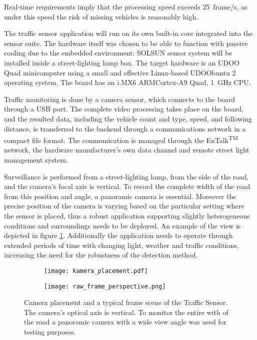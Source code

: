 Real-time requirements imply that the processing speed exceeds \SI{25}{frame/s}, as under this speed the risk of missing vehicles is reasonably high.

The traffic sensor application will run on its own built-in core integrated into the sensor suite.
The hardware itself was chosen to be able to function with passive cooling due to the embedded environment: SOLSUN sensor system will be installed inside a street-lighting lamp box.
The target hardware is an UDOO Quad minicomputer using a small and effective Linux-based UDOObuntu 2 operating system.
The board has an i.MX6 ARM\reg Cortex\reg-A9 Quad, \SI{1}{GHz} CPU.

Traffic monitoring is done by a camera sensor, which connects to the board through a USB port.
The complete video processing takes place on the board, and the resulted data, including the vehicle count and type, speed, and following distance, is transferred to the backend through a communications network in a compact file format.
The communication is managed through the EnTalk\textsuperscript{TM} network, the hardware manufacturer's own data channel and remote street light management system\cite{EnTalk}.

Surveillance is performed from a street-lighting lamp, from the side of the road, and the camera's focal axis is vertical.
To record the complete width of the road from this position and angle, a panoramic camera is essential.
Moreover the precise position of the camera is varying based on the particular setting where the sensor is placed, thus a robust application supporting slightly heterogeneous conditions and surroundings needs to be deployed. 
An example of the view is depicted in figure \ref{fig:camera_position}.
Additionally the application needs to operate through extended periods of time with changing light, weather and traffic conditions, increasing the need for the robustness of the detection method.

\begin{figure}
	\centering
	\begin{subfigure}{.5\textwidth}
		\centering
		\texttt{[image: kamera\_placement.pdf]}
	\end{subfigure}%
	\begin{subfigure}{.5\textwidth}
		\centering
		\texttt{[image: raw\_frame\_perspective.png]}
	\end{subfigure}
	\caption{Camera placement and a typical frame scene of the Traffic Sensor. The camera's optical axis is vertical. To monitor the entire with of the road a panoramic camera with a wide view angle was used for testing purposes.}
	\label{fig:camera_position}
\end{figure}

